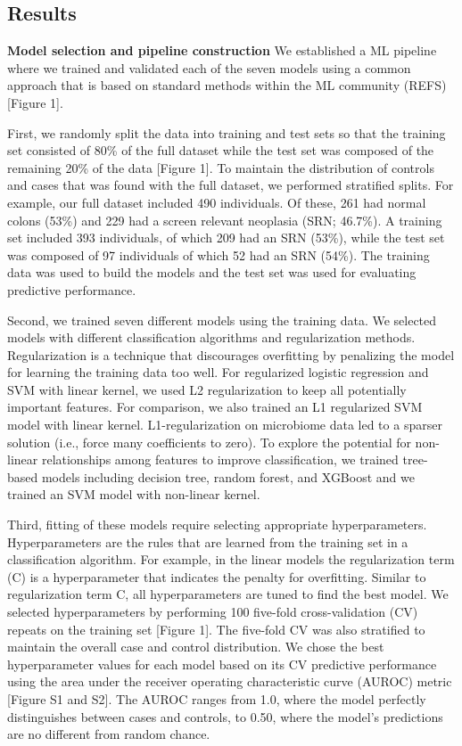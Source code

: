\documentclass[11pt,]{article}
\begin{document}
\subsection{Results}\label{results}

\textbf{Model selection and pipeline construction} We established a ML
pipeline where we trained and validated each of the seven models using a
common approach that is based on standard methods within the ML
community (REFS){[}Figure 1{]}.

First, we randomly split the data into training and test sets so that
the training set consisted of 80\% of the full dataset while the test
set was composed of the remaining 20\% of the data {[}Figure 1{]}. To
maintain the distribution of controls and cases that was found with the
full dataset, we performed stratified splits. For example, our full
dataset included 490 individuals. Of these, 261 had normal colons (53\%)
and 229 had a screen relevant neoplasia (SRN; 46.7\%). A training set
included 393 individuals, of which 209 had an SRN (53\%), while the test
set was composed of 97 individuals of which 52 had an SRN (54\%). The
training data was used to build the models and the test set was used for
evaluating predictive performance.

Second, we trained seven different models using the training data. We
selected models with different classification algorithms and
regularization methods. Regularization is a technique that discourages
overfitting by penalizing the model for learning the training data too
well. For regularized logistic regression and SVM with linear kernel, we
used L2 regularization to keep all potentially important features. For
comparison, we also trained an L1 regularized SVM model with linear
kernel. L1-regularization on microbiome data led to a sparser solution
(i.e., force many coefficients to zero). To explore the potential for
non-linear relationships among features to improve classification, we
trained tree-based models including decision tree, random forest, and
XGBoost and we trained an SVM model with non-linear kernel.

Third, fitting of these models require selecting appropriate
hyperparameters. Hyperparameters are the rules that are learned from the
training set in a classification algorithm. For example, in the linear
models the regularization term (C) is a hyperparameter that indicates
the penalty for overfitting. Similar to regularization term C, all
hyperparameters are tuned to find the best model. We selected
hyperparameters by performing 100 five-fold cross-validation (CV)
repeats on the training set {[}Figure 1{]}. The five-fold CV was also
stratified to maintain the overall case and control distribution. We
chose the best hyperparameter values for each model based on its CV
predictive performance using the area under the receiver operating
characteristic curve (AUROC) metric {[}Figure S1 and S2{]}. The AUROC
ranges from 1.0, where the model perfectly distinguishes between cases
and controls, to 0.50, where the model's predictions are no different
from random chance.
\end{document}
